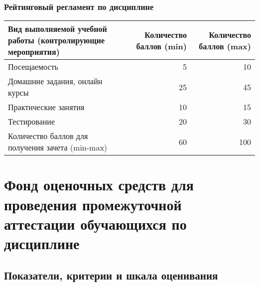 \documentclass[a4paper,12pt]{article}
\begin{document}
\subsubsection*{Рейтинговый регламент по дисциплине}
\begin{longtable}{|>{\raggedright\arraybackslash}p{110mm}|r|r|}
\hline
\centering\arraybackslash Вид выполняемой учебной работы (контролирующие мероприятия) & 
\multicolumn{1}{p{20mm}|}{\centering\arraybackslash Количество баллов (min)} & 
\multicolumn{1}{p{20mm}|}{\centering\arraybackslash Количество баллов (max)} \\
\hline
Посещаемость & 5 & 10 \\ 
\hline
Домашние задания, онлайн курсы & 25 & 45 \\ 
\hline
Практические занятия & 10 & 15 \\ 
\hline
Тестирование & 20 & 30 \\ 
\hline
Количество баллов для получения зачета (min-max) & 60 & 100 \\ 

\hline
\end{longtable}

\newpage
\section{Фонд оценочных средств для проведения промежуточной аттестации обучающихся по дисциплине}

\subsection{Показатели, критерии и шкала оценивания}
\end{document}

